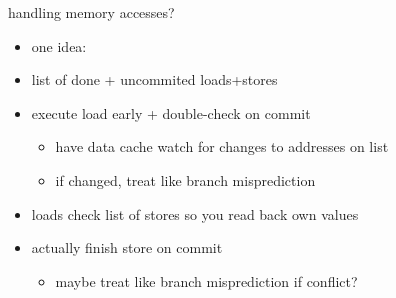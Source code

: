 \begin{frame}{handling memory accesses?}
    \begin{itemize}
    \item one idea:
    \item list of done + uncommited loads+stores
    \vspace{.5cm}
    \item execute load early + double-check on commit
        \begin{itemize}
        \item have data cache watch for changes to addresses on list
        \item if changed, treat like branch misprediction
        \end{itemize}
    \item loads check list of stores so you read back own values
    \item actually finish store on commit
        \begin{itemize}
        \item maybe treat like branch misprediction if conflict?
        \end{itemize}
    \end{itemize}
\end{frame}
